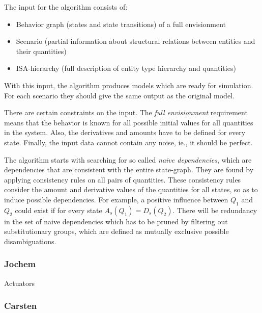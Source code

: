 \documentclass{article} %
\begin{document}
The input for the algorithm consists of:

\begin{itemize}

\item Behavior graph (states and state transitions) of a full envisionment

\item Scenario (partial information about structural relations between entities and their quantities)

\item ISA-hierarchy (full description of entity type hierarchy and quantities)

\end{itemize}

With this input, the algorithm produces models which are ready for simulation.
For each scenario they should give the same output as the original model.

There are certain constraints on the input. The \emph{full envisionment}
requirement means that the behavior is known for all possible initial values
for all quantities in the system. Also, the derivatives and amounts have to be
defined for every state. Finally, the input data cannot contain any noise,
ie., it should be perfect.

The algorithm starts with searching for so called \emph{naive dependencies},
which are dependencies that are consistent with the entire state-graph. They
are found by applying consistency rules on all pairs of quantities. These
consistency rules consider the amount and derivative values of the quantities
for all states, so as to induce possible dependencies. For example, a positive
influence between $Q_1$ and $Q_2$ could exist if for every state $A_s(Q_1) =
D_s(Q_2)$.  There will be redundancy in the set of naive dependencies which
has to be pruned by filtering out substitutionary groups, which are defined as
mutually exclusive possible disambiguations. 


\subsubsection{Jochem}

Actuators


\subsubsection{Carsten}
\end{document}

